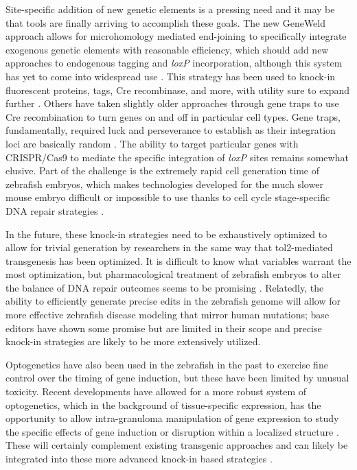 Site-specific addition of new genetic elements is a pressing need and it may be that tools are finally arriving to accomplish these goals. The new GeneWeld approach allows for microhomology mediated end-joining to specifically integrate exogenous genetic elements with reasonable efficiency, which should add new approaches to endogenous tagging and \textit{loxP} incorporation, although this system has yet to come into widespread use \citep{Wierson2020}. This strategy has been used to knock-in fluorescent proteins, tags, Cre recombinase, and more, with utility sure to expand further \citep{Almeida2021, Liu2022}. Others have taken slightly older approaches through gene traps to use Cre recombination to turn genes on and off in particular cell types. Gene traps, fundamentally, required luck and perseverance to establish as their integration loci are basically random \citep{Sugimoto2017}. The ability to target particular genes with CRISPR/Cas9 to mediate the specific integration of \textit{loxP} sites remains somewhat elusive. Part of the challenge is the extremely rapid cell generation time of zebrafish embryos, which makes technologies developed for the much slower mouse embryo difficult or impossible to use thanks to cell cycle stage-specific DNA repair strategies \citep{Hustedt2016, Prill2020}.

In the future, these knock-in strategies need to be exhaustively optimized to allow for trivial generation by researchers in the same way that tol2-mediated transgenesis has been optimized. It is difficult to know what variables warrant the most optimization, but pharmacological treatment of zebrafish embryos to alter the balance of DNA repair outcomes seems to be promising \citep{Nakade2014, Luo2018}. Relatedly, the ability to efficiently generate precise edits in the zebrafish genome will allow for more effective zebrafish disease modeling that mirror human mutations; base editors have shown some promise but are limited in their scope and precise knock-in strategies are likely to be more extensively utilized. 

Optogenetics have also been used in the zebrafish in the past to exercise fine control over the timing of gene induction, but these have been limited by unusual toxicity. Recent developments have allowed for a more robust system of optogenetics, which in the background of tissue-specific expression, has the opportunity to allow intra-granuloma manipulation of gene expression to study the specific effects of gene induction or disruption within a localized structure \citep{Deisseroth2015}. These will certainly complement existing transgenic approaches and can likely be integrated into these more advanced knock-in based strategies \citep{Reade2017}.

